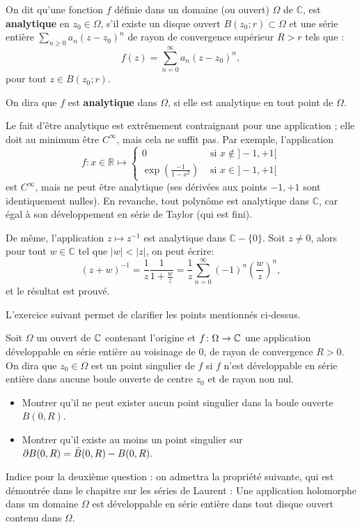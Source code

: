 \begin{fdefn}
On dit qu'une fonction $f$ définie dans un domaine (ou ouvert) $\Omega$ de $\mathbb{C}$, est \textbf{analytique} en $z_0 \in \Omega$, s'il existe un disque ouvert $B(z_0 ; r) \subset \Omega$ et une série entière
$\sum_{n \geq 0}a_n (z -z_0)^n$ de rayon de convergence supérieur $R>r$ tels que :
\[f(z) = \sum_{n =0}^\infty a_n(z-z_0)^n,\]
pour tout $z \in B(z_0 ; r)$. 

On dira que $f$ est \textbf{analytique} dans $\Omega$, si elle est analytique en tout
point de $\Omega$.
\end{fdefn}

Le fait d'être analytique est extrêmement contraignant pour une application ; elle doit au minimum être $C^\infty$, mais cela ne suffit pas. Par exemple, l'application
\[f \colon x \in \mathbb{R} \mapsto \left\{
\begin{array}{cc}
0 & \text{ si } x \notin ]-1,+1[ \\
\exp\left(\frac{-1}{1-x^2}\right) &  \text{ si } x \in ]-1,+1[
\end{array}
\right.
\]
est $C^\infty$, mais ne peut être analytique (ses dérivées aux points $-1,+1$
sont identiquement nulles).
En revanche, tout polynôme est analytique dans $\mathbb{C}$, car égal à son
développement en série de Taylor (qui est fini). 

De même, l'application $z
\mapsto z^{-1}$ est analytique dans $\mathbb{C}-\{0\}$. Soit $z \neq 0$, alors pour
tout $w \in \mathbb{C}$ tel que $|w|<|z|$, on peut écrire:
\[(z+w)^{-1}=  \frac{1}{z}\frac{1}{1+\frac{w}{z}} = \frac{1}{z} \sum_{n=0}^\infty (-1)^n \left( \frac{w}{z} \right)^n,\]
et le résultat est prouvé. 


L'exercice suivant permet de clarifier les points mentionnés ci-dessus.
\begin{exercice}
    Soit $\Omega$ un ouvert de $\mathbb{C}$ contenant l'origine et $f \colon \Omega \to \mathbb{C}$ une application développable en
    série entière au voisinage de $0$, de rayon de convergence $R > 0$. On dira que $z_0 \in \Omega$ est un point singulier de $f$ si $f$ n'est développable en série entière dans aucune boule ouverte de centre $z_0$ et de rayon non nul.
    \begin{itemize}
        \item Montrer qu'il ne peut exister aucun point singulier dans la boule ouverte $B(0,R).$
        \item Montrer qu'il existe au moins un point singulier sur $\partial B(0,R) = \Bar{B}(0,R)-B(0,R).$ 
    \end{itemize}
    Indice pour la deuxième question : on admettra la propriété suivante, qui est démontrée dans le chapitre sur les séries de Laurent : Une application holomorphe dans un domaine $\Omega$ est développable en série entière dans tout disque ouvert contenu dans $\Omega.$ 
     
\end{exercice}

